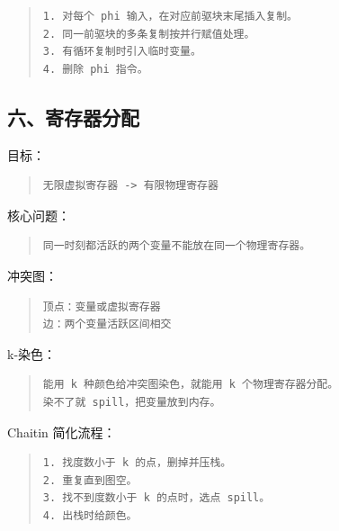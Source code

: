 \documentclass[UTF8,zihao=-4]{ctexart}
\begin{document}
\begin{quote}
\footnotesize
\begin{verbatim}
1. 对每个 phi 输入，在对应前驱块末尾插入复制。
2. 同一前驱块的多条复制按并行赋值处理。
3. 有循环复制时引入临时变量。
4. 删除 phi 指令。
\end{verbatim}
\end{quote}


\subsection{六、寄存器分配}


目标：


\begin{quote}
\footnotesize
\begin{verbatim}
无限虚拟寄存器 -> 有限物理寄存器
\end{verbatim}
\end{quote}


核心问题：


\begin{quote}
\footnotesize
\begin{verbatim}
同一时刻都活跃的两个变量不能放在同一个物理寄存器。
\end{verbatim}
\end{quote}


冲突图：


\begin{quote}
\footnotesize
\begin{verbatim}
顶点：变量或虚拟寄存器
边：两个变量活跃区间相交
\end{verbatim}
\end{quote}


k-染色：


\begin{quote}
\footnotesize
\begin{verbatim}
能用 k 种颜色给冲突图染色，就能用 k 个物理寄存器分配。
染不了就 spill，把变量放到内存。
\end{verbatim}
\end{quote}


Chaitin 简化流程：


\begin{quote}
\footnotesize
\begin{verbatim}
1. 找度数小于 k 的点，删掉并压栈。
2. 重复直到图空。
3. 找不到度数小于 k 的点时，选点 spill。
4. 出栈时给颜色。
\end{verbatim}
\end{quote}
\end{document}
